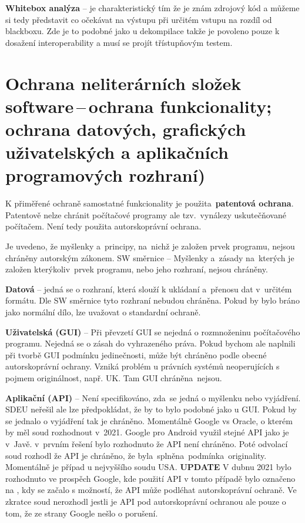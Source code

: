\textbf{Whitebox analýza} -- je charakteristický tím že je znám zdrojový kód a můžeme si tedy představit co očekávat na výstupu při určitém vstupu na rozdíl od blackboxu. Zde je to podobné jako u dekompilace takže je povoleno pouze k dosažení interoperability a musí se projít třístupňovým testem.










\newpage
\section{Ochrana neliterárních složek software\,--\,ochrana funkcionality; ochrana datových, grafických uživatelských a aplikačních programových rozhraní)}

K přiměřené ochraně samostatné funkcionality je použita~\textbf{patentová ochrana}. Patentově nelze chránit počítačové programy ale tzv.\ vynálezy uskutečňované počítačem. Není tedy použita autorskoprávní ochrana.

Je uvedeno, že myšlenky a~principy, na~nichž je založen prvek programu, nejsou chráněny autorským zákonem. SW směrnice -- Myšlenky a~zásady na~kterých je založen kterýkoliv~prvek programu, nebo jeho rozhraní, nejsou chráněny. 

\textbf{Datová} -- jedná se o rozhraní, která slouží k ukládaní a~přenosu dat v~určitém formátu. Dle SW směrnice tyto rozhraní nebudou chráněna. Pokud by bylo bráno jako normální dílo, lze uvažovat o standardní ochraně.

\textbf{Uživatelská (GUI)} -- Při převzetí GUI se nejedná o rozmnoženinu počítačového programu. \textrightarrow Nejedná se o zásah do vyhrazeného práva. Pokud bychom ale naplnili při tvorbě GUI podmínku jedinečnosti, může být chráněno podle obecné autorskoprávní ochrany. Vzniká problém u právních systémů neoperujících s pojmem originálnost, např. UK. Tam GUI chráněna~nejsou.

\textbf{Aplikační (API)} -- Není specifikováno, zda~se jedná o myšlenku nebo vyjádření. SDEU neřešil ale lze předpokládat, že by to bylo podobné jako u GUI. Pokud by se jednalo o vyjádření tak je chráněno. Momentálně Google vs Oracle, o kterém by měl soud rozhodnout v~2021. Google pro Android využil stejné API jako je v~Javě. v~prvním řešení bylo rozhodnuto že API není chráněno. Poté odvolací soud rozhodl že API je chráněno, že byla~splněna~podmínka~originality. Momentálně je případ u nejvyššího soudu USA. \textbf{UPDATE} V dubnu 2021 bylo rozhodnuto ve prospěch Google, kde použití API v tomto případě bylo označeno na , kdy se začalo s možností, že API může podléhat autorskoprávní ochraně. Ve zkratce soud nerozhodl jestli je API pod autorskoprávní ochranou ale pouze o tom, že ze strany Google nešlo o porušení.  




